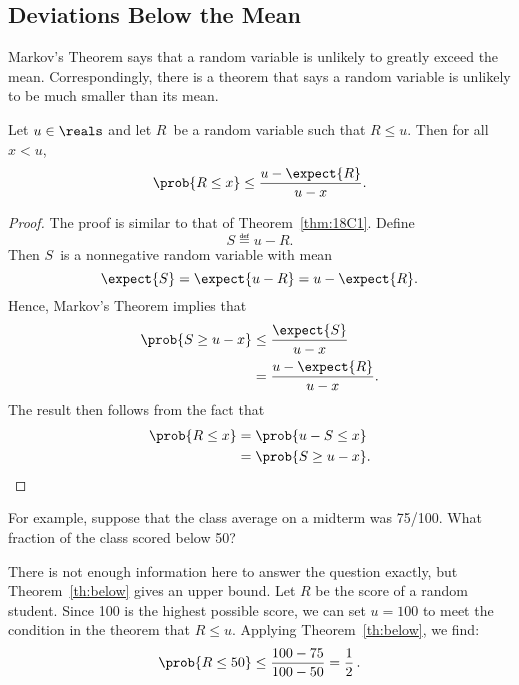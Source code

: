 \subsection{Deviations Below the Mean}

Markov's Theorem says that a random variable is unlikely to greatly exceed
the mean.  Correspondingly, there is a theorem that says a random variable
is unlikely to be much smaller than its mean.

\begin{theorem}
\label{th:below}
Let $u \in \reals$ and let $R$~be a random variable such that $R \leq
u$.  Then for all~$x < u$, 
\[
    \prob{R \leq x} \leq \frac{u - \expect{R}}{u - x}.
\]
\end{theorem}

\begin{proof}
The proof is similar to that of Theorem~\ref{thm:18C1}.  Define
\begin{equation*}
    S \eqdef u - R.
\end{equation*}
Then $S$~is a nonnegative random variable with mean
\begin{equation*}
    \expect{S} = \expect{u - R} = u - \expect{R}.
\end{equation*}
Hence, Markov's Theorem implies that
\begin{align*}
\prob{S \ge u - x}
    & \le \frac{\expect{S}}{u - x} \\
    &= \frac{u - \expect{R}}{u - x}.
\end{align*}
The result then follows from the fact that
\begin{align*}
\prob{R \le x}
    &= \prob{u - S \le x} \\
    &= \prob{S \ge u - x}. \qedhere
\end{align*}
\end{proof}

For example, suppose that the class average on a midterm was
75/100.  What fraction of the class scored below 50?

There is not enough information here to answer the question exactly,
but Theorem~\ref{th:below} gives an upper bound.  Let $R$ be the score
of a random student.  Since 100 is the highest possible score, we can
set $u = 100$ to meet the condition in the theorem that $R \leq u$.
Applying Theorem~\ref{th:below}, we find:
\begin{equation*}
  \prob{R \leq 50} \leq \frac{100 - 75}{100 - 50} = \frac{1}{2}\,.
\end{equation*}

